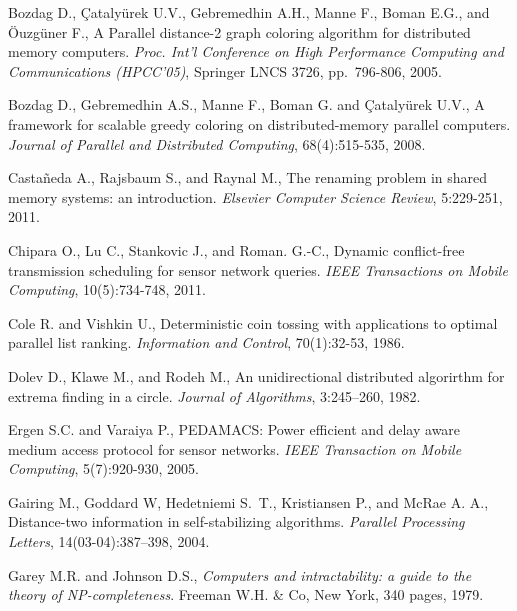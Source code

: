 \documentclass[11pt,english]{article}
\begin{document}
\begin{thebibliography}{99}
{\vspace{-0.1cm}
Bozdag D.,  \c{C}ataly\"urek U.V.,  Gebremedhin A.H.,   Manne F., 
 Boman E.G., and  \"Ouzg\"uner F., 
A Parallel distance-2 graph coloring algorithm for
distributed memory computers. 
{\it Proc. Int'l Conference on High Performance Computing and Communications
 (HPCC'05)},  Springer LNCS 3726,  pp.~796-806, 2005. 


\vspace{-0.1cm}
Bozdag D.,  Gebremedhin A.S.,  Manne F., Boman G. and \c{C}ataly\"urek U.V.,
A framework for scalable greedy coloring on distributed-memory parallel 
computers.
{\it Journal of Parallel and Distributed  Computing},  68(4):515-535, 2008. 

\vspace{-0.1cm}
Casta\~neda A.,  Rajsbaum S., and  Raynal M., 
The renaming problem in shared memory systems: an introduction.
{\it Elsevier Computer Science Review}, 5:229-251, 2011. 

\vspace{-0.1cm}
Chipara O., Lu C., Stankovic J., and Roman. G.-C.,
Dynamic conflict-free transmission scheduling for sensor network
  queries.
{\it  IEEE Transactions on Mobile Computing}, 10(5):734-748, 2011.


\vspace{-0.1cm}
Cole R. and  Vishkin U., 
Deterministic coin tossing  with applications to optimal parallel list ranking.
{\it Information and Control}, 70(1):32-53, 1986.

\vspace{-0.1cm}
Dolev D., Klawe M.,  and Rodeh M.,
An  unidirectional distributed algorirthm for extrema finding 
in a circle.
{\it Journal of Algorithms}, 3:245--260, 1982. 

\vspace{-0.1cm}
Ergen S.C. and  Varaiya P., 
PEDAMACS: Power efficient and delay aware medium access protocol
for sensor networks. 
{\it IEEE Transaction on Mobile Computing}, 5(7):920-930, 2005.

\vspace{-0.1cm}
Gairing M., Goddard W, Hedetniemi S.~T., Kristiansen P., and McRae
A. A.,
Distance-two information in self-stabilizing algorithms.
{\it Parallel Processing Letters}, 14(03-04):387--398, 2004.

\vspace{-0.1cm}
Garey M.R. and Johnson D.S.,
{\it Computers and intractability: a guide to the theory of  NP-completeness}. 
Freeman W.H. \& Co, New York, 340 pages, 1979.


}
\end{thebibliography}
\end{document}
